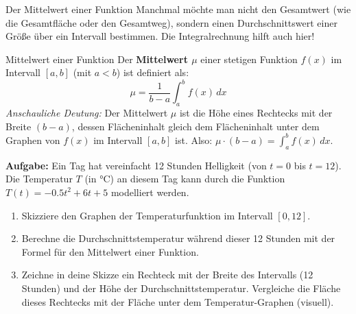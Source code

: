 \begin{aufgabenumgebung}{Der Mittelwert einer Funktion}
Manchmal möchte man nicht den Gesamtwert (wie die Gesamtfläche oder den Gesamtweg), sondern einen Durchschnittswert einer Größe über ein Intervall bestimmen. Die Integralrechnung hilft auch hier!

\begin{merksatzumgebung}{Mittelwert einer Funktion}
Der \textbf{Mittelwert $\mu$} einer stetigen Funktion $f(x)$ im Intervall $[a,b]$ (mit $a<b$) ist definiert als:
\[ \mu = \frac{1}{b-a} \int_a^b f(x) \,dx \]
\textit{Anschauliche Deutung:} Der Mittelwert $\mu$ ist die Höhe eines Rechtecks mit der Breite $(b-a)$, dessen Flächeninhalt gleich dem Flächeninhalt unter dem Graphen von $f(x)$ im Intervall $[a,b]$ ist. Also: $\mu \cdot (b-a) = \int_a^b f(x) \,dx$.
\end{merksatzumgebung}

\textbf{Aufgabe:}
Ein Tag hat vereinfacht 12 Stunden Helligkeit (von $t=0$ bis $t=12$). Die Temperatur $T$ (in °C) an diesem Tag kann durch die Funktion $T(t) = -0.5t^2 + 6t + 5$ modelliert werden.
\begin{enumerate}
    \item Skizziere den Graphen der Temperaturfunktion im Intervall $[0,12]$.
    \item Berechne die Durchschnittstemperatur während dieser 12 Stunden mit der Formel für den Mittelwert einer Funktion.
    \item Zeichne in deine Skizze ein Rechteck mit der Breite des Intervalls (12 Stunden) und der Höhe der Durchschnittstemperatur. Vergleiche die Fläche dieses Rechtecks mit der Fläche unter dem Temperatur-Graphen (visuell).
\end{enumerate}
\end{aufgabenumgebung}

